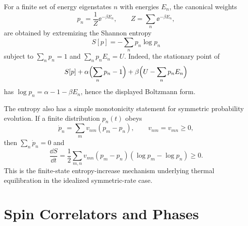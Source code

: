 For a finite set of energy eigenstates \(n\) with energies \(E_n\), the
canonical weights
\[
  p_n=\frac{1}{Z}\ee^{-\beta E_n},
  \qquad
  Z=\sum_n\ee^{-\beta E_n},
\]
are obtained by extremizing the Shannon entropy
\[
  S[p]=-\sum_n p_n\log p_n
\]
subject to \(\sum_np_n=1\) and \(\sum_np_nE_n=U\).  Indeed, the stationary
point of
\[
  S[p]+\alpha\Bigl(\sum_np_n-1\Bigr)
  +\beta\Bigl(U-\sum_np_nE_n\Bigr)
\]
has \(\log p_n=\alpha-1-\beta E_n\), hence the displayed Boltzmann form.

The entropy also has a simple monotonicity statement for symmetric probability
evolution.  If a finite distribution \(p_n(t)\) obeys
\[
  \dot p_n=\sum_m v_{nm}(p_m-p_n),
  \qquad
  v_{nm}=v_{mn}\geq0 ,
\]
then \(\sum_n\dot p_n=0\) and
\[
  \frac{\dd S}{\dd t}
  =
  \frac12\sum_{m,n}v_{mn}(p_m-p_n)(\log p_m-\log p_n)\geq0 .
\]
This is the finite-state entropy-increase mechanism underlying thermal
equilibration in the idealized symmetric-rate case.

\section{Spin Correlators and Phases}

